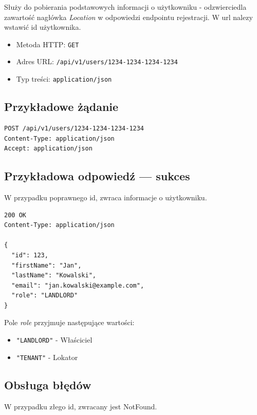\documentclass[11pt, a4paper]{article}
\begin{document}
Służy do pobierania podstawowych informacji o użytkowniku - odzwierciedla zawartość nagłówka \textit{Location} w odpowiedzi endpointu rejestracji. W url nalezy wstawić id użytkownika.

\begin{itemize}
    \item Metoda HTTP: \texttt{GET}
    \item Adres URL: \texttt{/api/v1/users/1234-1234-1234-1234}
    \item Typ treści: \texttt{application/json}
\end{itemize}

\subsection{Przykładowe żądanie}

\begin{lstlisting}[style=http,caption={Przykładowe żądanie rejestracji}]
POST /api/v1/users/1234-1234-1234-1234
Content-Type: application/json
Accept: application/json
\end{lstlisting}

\subsection{Przykładowa odpowiedź — sukces}

W przypadku poprawnego id, zwraca informacje o użytkowniku.

\begin{lstlisting}[style=http,caption={Odpowiedź HTTP — sukces}]
200 OK
Content-Type: application/json

{
  "id": 123,
  "firstName": "Jan",
  "lastName": "Kowalski",
  "email": "jan.kowalski@example.com",
  "role": "LANDLORD"
}
\end{lstlisting}

Pole \textit{role} przyjmuje następujące wartości:
\begin{itemize}
  \item \texttt{"LANDLORD"} - Właściciel
  \item \texttt{"TENANT"} - Lokator
\end{itemize}

\subsection{Obsługa błędów}

W przypadku złego id, zwracany jest NotFound.
\end{document}
